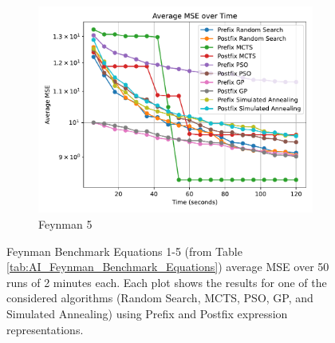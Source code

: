 \documentclass[runningheads]{llncs}
\begin{document}
\begin{figure}
    \vspace{0.5cm}
    
    \begin{subfigure}[b]{0.4\textwidth}
        \includegraphics[width=\linewidth, keepaspectratio]{AIFeynman_Benchmarks/Feynman_Benchmark_5.pdf}
        \caption{Feynman 5}
        \label{subfig:feynman_5}
    \end{subfigure}
    
    \caption{Feynman Benchmark Equations 1-5 (from Table \ref{tab:AI_Feynman_Benchmark_Equations}) average MSE over 50 runs of 2 minutes each. Each plot shows the results for one of the considered algorithms (Random Search, MCTS, PSO, GP, and Simulated Annealing) using Prefix and Postfix expression representations.}
    \label{fig:Feynman_Benchmarks}
\end{figure}

    
    
\end{document}
